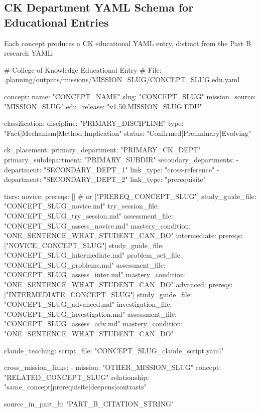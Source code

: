 \documentclass[11pt,letterpaper]{article}
\begin{document}
\subsection{CK Department YAML Schema for Educational Entries}

Each concept produces a CK educational YAML entry, distinct from the Part B research YAML:

\begin{asciibox}
# College of Knowledge Educational Entry
# File: .planning/outputs/missions/{MISSION_SLUG}/{CONCEPT_SLUG}.edu.yaml

concept:
  name: "{CONCEPT_NAME}"
  slug: "{CONCEPT_SLUG}"
  mission_source: "{MISSION_SLUG}"
  edu_release: "v1.50.{MISSION_SLUG}.EDU"

  classification:
    discipline: "{PRIMARY_DISCIPLINE}"
    type: "Fact|Mechanism|Method|Implication"
    status: "Confirmed|Preliminary|Evolving"

  ck_placement:
    primary_department: "{PRIMARY_CK_DEPT}"
    primary_subdepartment: "{PRIMARY_SUBDIR}"
    secondary_departments:
      - department: "{SECONDARY_DEPT_1}"
        link_type: "cross-reference"
      - department: "{SECONDARY_DEPT_2}"
        link_type: "prerequisite"

  tiers:
    novice:
      prereqs: []  # or ["{PREREQ_CONCEPT_SLUG}"]
      study_guide_file: "{CONCEPT_SLUG}_novice.md"
      try_session_file: "{CONCEPT_SLUG}_try_session.md"
      assessment_file: "{CONCEPT_SLUG}_assess_novice.md"
      mastery_condition: "{ONE_SENTENCE_WHAT_STUDENT_CAN_DO}"
    intermediate:
      prereqs: ["{NOVICE_CONCEPT_SLUG}"]
      study_guide_file: "{CONCEPT_SLUG}_intermediate.md"
      problem_set_file: "{CONCEPT_SLUG}_problems.md"
      assessment_file: "{CONCEPT_SLUG}_assess_inter.md"
      mastery_condition: "{ONE_SENTENCE_WHAT_STUDENT_CAN_DO}"
    advanced:
      prereqs: ["{INTERMEDIATE_CONCEPT_SLUG}"]
      study_guide_file: "{CONCEPT_SLUG}_advanced.md"
      investigation_file: "{CONCEPT_SLUG}_investigation.md"
      assessment_file: "{CONCEPT_SLUG}_assess_adv.md"
      mastery_condition: "{ONE_SENTENCE_WHAT_STUDENT_CAN_DO}"

  claude_teaching:
    script_file: "{CONCEPT_SLUG}_claude_script.yaml"

  cross_mission_links:
    - mission: "{OTHER_MISSION_SLUG}"
      concept: "{RELATED_CONCEPT_SLUG}"
      relationship: "same_concept|prerequisite|deepens|contrasts"

  source_in_part_b: "{PART_B_CITATION_STRING}"
\end{asciibox}
\end{document}
